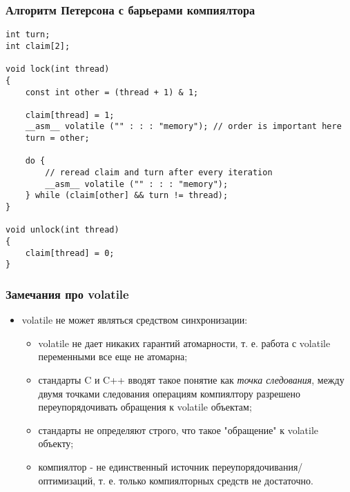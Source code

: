 \begin{frame}[fragile]
\frametitle{Алгоритм Петерсона с барьерами компиялтора}
\begin{lstlisting}
int turn;
int claim[2];

void lock(int thread)
{
	const int other = (thread + 1) & 1;

	claim[thread] = 1;
	__asm__ volatile ("" : : : "memory"); // order is important here
	turn = other;

	do {
		// reread claim and turn after every iteration
		__asm__ volatile ("" : : : "memory");
	} while (claim[other] && turn != thread);
}

void unlock(int thread)
{
	claim[thread] = 0;
}
\end{lstlisting}
\end{frame}

\begin{frame}
\frametitle{Замечания про volatile}
\begin{itemize}
  \item volatile не может являться средством синхронизации:
  \begin{itemize}
    \item volatile не дает никаких гарантий атомарности, т. е. работа с volatile
    переменными все еще не атомарна;
    \item стандарты C и C++ вводят такое понятие как \emph{точка следования},
    между двумя точками следования операциям компиялтору разрешено
    переупорядочивать обращения к volatile объектам;
    \item стандарты не определяют строго, что такое "обращение" к volatile
    объекту;
    \item компиялтор - не единственный источник переупорядочивания/оптимизаций,
    т. е. только компиялторных средств не достаточно.
  \end{itemize}
\end{itemize}
\end{frame}
